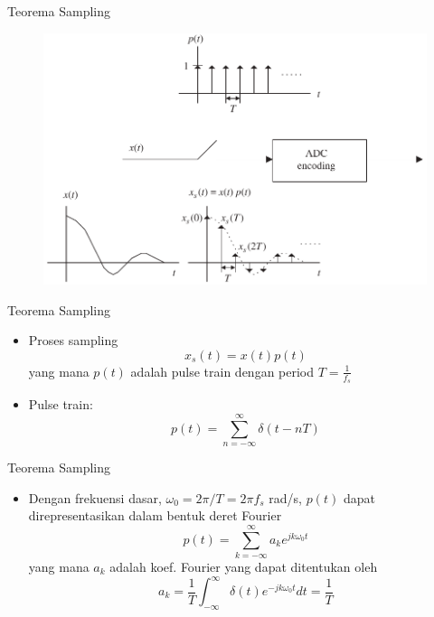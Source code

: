 \documentclass[pdflatex,compress,mathserif]{beamer}
\begin{document}
\begin{frame}{Teorema Sampling}
    \begin{figure}
        \includegraphics[width=0.9\linewidth]{./img/img08}
    \end{figure}
\end{frame}

\begin{frame}{Teorema Sampling}
    \begin{itemize}
        \item Proses sampling
        \begin{equation}
            x_s(t) = x(t) p(t)
            \label{eq:xs}
        \end{equation}
        yang mana $p(t)$ adalah pulse train dengan period $T = \frac{1}{f_s}$
        \item Pulse train:
        \begin{equation}
            p(t) = \sum_{n = - \infty}^\infty \delta(t - nT)
        \end{equation}
    \end{itemize}
\end{frame}

\begin{frame}{Teorema Sampling}
    \begin{itemize}
        \item Dengan frekuensi dasar, $\omega_0 = 2\pi/T = 2\pi f_s$ rad/s, $p(t)$ dapat direpresentasikan dalam bentuk deret Fourier
        \begin{equation}
            p(t) = \sum_{k = - \infty}^\infty a_k e^{jk\omega_0t}
            \label{eq:pt_deret}
        \end{equation}
        yang mana $a_k$ adalah koef. Fourier yang dapat ditentukan oleh
        \begin{equation}
            a_k = \frac{1}{T} \int_{-\infty}^{\infty} \delta(t)e^{-jk\omega_0t}dt = \frac{1}{T}
            \label{eq:keof.Fourier}
        \end{equation}
    \end{itemize}
\end{frame}
\end{document}
